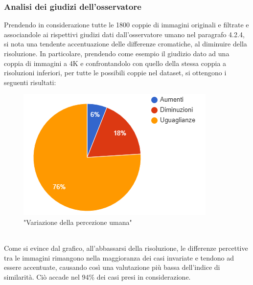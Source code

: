 \documentclass[a4paper,11pt]{article}
\begin{document}
    \subsubsection{Analisi dei giudizi dell'osservatore}
    Prendendo in considerazione tutte le 1800 coppie di immagini originali e filtrate e associandole ai rispettivi giudizi dati
    dall'osservatore umano nel paragrafo 4.2.4, si nota una tendente accentuazione delle differenze cromatiche, al diminuire della risoluzione.
    In particolare, prendendo come esempio il giudizio dato ad una coppia di immagini a 4K e confrontandolo con quello della stessa coppia a risoluzioni inferiori, per tutte le possibili coppie nel dataset,
    si ottengono i seguenti risultati:
    \begin{figure}[h]
        \centering
        \includegraphics{chart1}
        \caption{"Variazione della percezione umana"}
    \end{figure}
    \\Come si evince dal grafico, all'abbassarsi della risoluzione, le differenze percettive tra le immagini rimangono nella maggioranza dei casi invariate e tendono ad essere accentuate, causando così
    una valutazione più bassa dell'indice di similarità. Ciò accade nel 94\% dei casi presi in considerazione.
    \newpage
\end{document}
